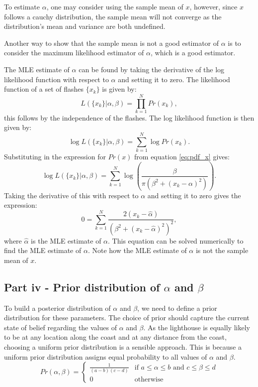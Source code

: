 \documentclass[11pt]{article}
\begin{document}
To estimate $\alpha$, one may consider using the sample mean of $x$, however, since $x$ follows a cauchy distribution, the sample mean will not converge as the distribution's mean and variance are both undefined.

Another way to show that the sample mean is not a good estimator of $\alpha$ is to consider the maximum likelihood estimator of $\alpha$, which is a good estimator.

The MLE estimate of $\alpha$ can be found by taking the derivative of the log likelihood function with respect to $\alpha$ and setting it to zero. The likelihood function of a set of flashes $\{x_k\}$ is given by:
\[
L(\{x_k\}|\alpha,\beta) = \prod_{k=1}^{N} Pr(x_k),
\] this follows by the independence of the flashes. The log likelihood function is then given by:
\[
\log L(\{x_k\}|\alpha,\beta) = \sum_{k=1}^{N} \log Pr(x_k).
\] Substituting in the expression for $Pr(x)$ from equation \ref{eq:pdf_x} gives:
\[
\log L(\{x_k\}|\alpha,\beta) = \sum_{k=1}^{N} \log \left( \frac{\beta}{\pi(\beta^2 + (x_k-\alpha)^2)} \right).
\]
Taking the derivative of this with respect to $\alpha$ and setting it to zero gives the expression:
\[
0 = \sum_{k=1}^{N} \frac{2(x_k-\hat\alpha)}{(\beta^2 + (x_k - \hat\alpha)^2)^2},
\] where $\hat\alpha$ is the MLE estimate of $\alpha$. This equation can be solved numerically to find the MLE estimate of $\alpha$. Note how the MLE estimate of $\alpha$ is not the sample mean of $x$.

\subsection{Part iv - Prior distribution of $\alpha$ and $\beta$}

To build a posterior distribution of $\alpha$ and $\beta$, we need to define a prior distribution for these parameters. The choice of prior should capture the current state of belief regarding the values of $\alpha$ and $\beta$. As the lighthouse is equally likely to be at any location along the coast and at any distance from the coast, choosing a uniform prior distribution is a sensible approach. This is because a uniform prior distribution assigns equal probability to all values of $\alpha$ and $\beta$. 
\begin{equation}
Pr(\alpha, \beta) = \left\{
    \begin{array}{ll}
        \frac{1}{(a-b)(c-d)} & \text{if }  a \leq \alpha \leq b \text{ and } c \leq \beta \leq d  \\
        0 & \text{otherwise}
    \end{array}
\right.
\end{equation}
\end{document}
